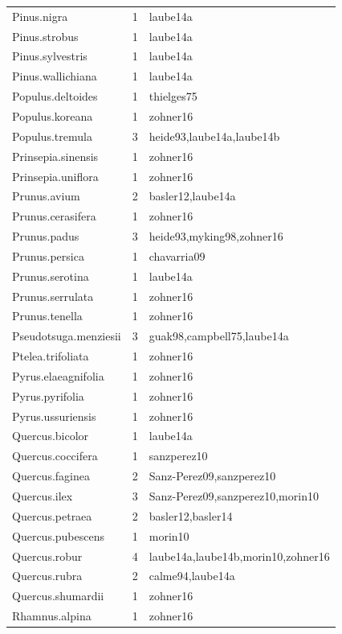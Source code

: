 \documentclass{article}
\begin{document}
\begin{footnotesize}
\begin{longtable}{|p{}|p{}|p{}|}
  Pinus.nigra &   1 & laube14a \\ 
  Pinus.strobus &   1 & laube14a \\ 
  Pinus.sylvestris &   1 & laube14a \\ 
  Pinus.wallichiana &   1 & laube14a \\ 
  Populus.deltoides &   1 & thielges75 \\ 
  Populus.koreana &   1 & zohner16 \\ 
  Populus.tremula &   3 & heide93,laube14a,laube14b \\ 
  Prinsepia.sinensis &   1 & zohner16 \\ 
  Prinsepia.uniflora &   1 & zohner16 \\ 
  Prunus.avium &   2 & basler12,laube14a \\ 
  Prunus.cerasifera &   1 & zohner16 \\ 
  Prunus.padus &   3 & heide93,myking98,zohner16 \\ 
  Prunus.persica &   1 & chavarria09 \\ 
  Prunus.serotina &   1 & laube14a \\ 
  Prunus.serrulata &   1 & zohner16 \\ 
  Prunus.tenella &   1 & zohner16 \\ 
  Pseudotsuga.menziesii &   3 & guak98,campbell75,laube14a \\ 
  Ptelea.trifoliata &   1 & zohner16 \\ 
  Pyrus.elaeagnifolia &   1 & zohner16 \\ 
  Pyrus.pyrifolia &   1 & zohner16 \\ 
  Pyrus.ussuriensis &   1 & zohner16 \\ 
  Quercus.bicolor &   1 & laube14a \\ 
  Quercus.coccifera &   1 & sanzperez10 \\ 
  Quercus.faginea &   2 & Sanz-Perez09,sanzperez10 \\ 
  Quercus.ilex &   3 & Sanz-Perez09,sanzperez10,morin10 \\ 
  Quercus.petraea &   2 & basler12,basler14 \\ 
  Quercus.pubescens &   1 & morin10 \\ 
  Quercus.robur &   4 & laube14a,laube14b,morin10,zohner16 \\ 
  Quercus.rubra &   2 & calme94,laube14a \\ 
  Quercus.shumardii &   1 & zohner16 \\ 
  Rhamnus.alpina &   1 & zohner16 \\ 

\end{longtable}
\end{footnotesize}
\end{document}
